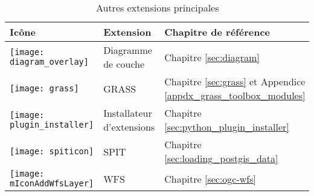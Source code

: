 \begin{table}[H]
\centering
 \begin{tabular}{|l|l|p{8cm}|}
\hline \textbf{Icône} & \textbf{Extension} & \textbf{Chapitre de référence}\\
\hline
\texttt{[image: diagram\_overlay]}
 & Diagramme de couche \index{plugins!diagram} & Chapitre \ref{sec:diagram}\\
\hline
\texttt{[image: grass]}
 & GRASS \index{plugin!grass toolbox} & Chapitre \ref{sec:grass} et Appendice \ref{appdx_grass_toolbox_modules}\\
 \hline
\texttt{[image: plugin\_installer]}
 & Installateur d'extensions \index{plugins!Plugin Installer} & Chapitre \ref{sec:python_plugin_installer}\\
\hline
\texttt{[image: spiticon]}
 & SPIT \index{plugins!spit} & Chapitre \ref{sec:loading_postgis_data} \\
 \hline
\texttt{[image: mIconAddWfsLayer]}
 & WFS & Chapitre \ref{sec:ogc-wfs} \\
\hline
\end{tabular}
\caption{Autres extensions principales}\label{tab:other_core}
\end{table}

